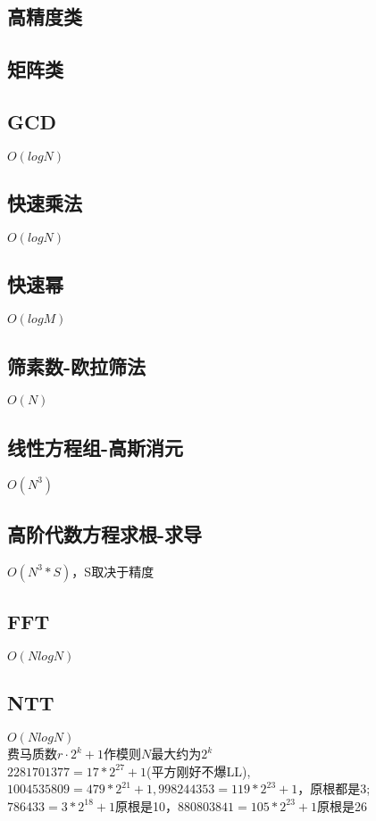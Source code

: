 \documentclass[10pt]{article}
\begin{document}
\subsection{高精度类}


\subsection{矩阵类}


\subsection{GCD}
$O(logN)$


\subsection{快速乘法}
$O(logN)$


\subsection{快速幂}
$O(logM)$


\subsection{筛素数-欧拉筛法}
$O(N)$


\subsection{线性方程组-高斯消元}
$O(N^3)$


\subsection{高阶代数方程求根-求导}
$O(N^3*S)$，S取决于精度


\subsection{FFT}
$O(NlogN)$


\subsection{NTT}
$O(NlogN)$\\
费马质数$r\cdot 2^k+1$作模则$N$最大约为$2^k$\\
$2281701377=17*2^{27}+1$(平方刚好不爆LL), $1004535809=479*2^{21}+1, 998244353=119*2^{23}+1$，原根都是3;\\
$786433=3*2^{18}+1$原根是10，$880803841=105*2^{23}+1$原根是26

\end{document}
